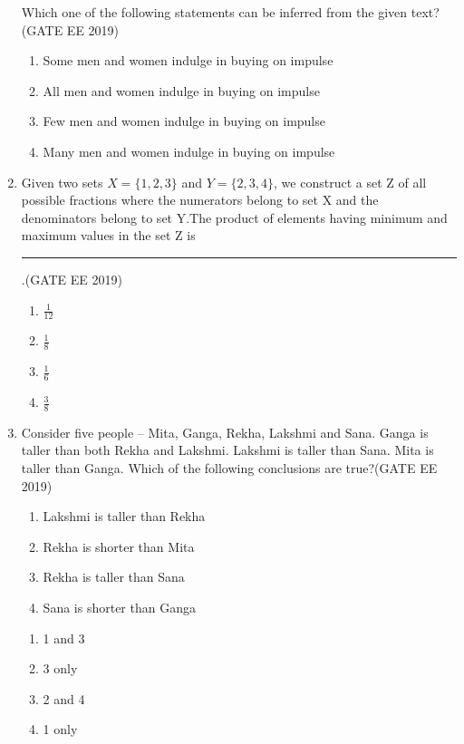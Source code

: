 \documentclass[a4paper,10pt]{exam}
\theoremstyle{remark}
\begin{document}
\begin{enumerate}
Which one of the following statements can be inferred from the given text?\hfill{(GATE EE 2019)}
\begin{enumerate}
    \item Some men and women indulge in buying on impulse
    \item All men and women indulge in buying on impulse
    \item Few men and women indulge in buying on impulse
    \item Many men and women indulge in buying on impulse
\end{enumerate}
\item  Given two sets $ X = \{ 1, 2, 3 \}$  and $ Y = \{ 2, 3, 4 \} $, we construct a set Z of all possible fractions where the numerators belong to set X and the denominators belong to set Y.The product of elements having minimum and maximum values in the set Z is \rule{1.5cm}{0.15mm} .\hfill{(GATE EE 2019)}
\begin{multicols}{4}
\begin{enumerate}
\item $\frac{1}{12}$
\item $\frac{1}{8}$
\item $\frac{1}{6}$
\item $\frac{3}{8}$
\end{enumerate}
\end{multicols}

\item Consider five people -- Mita, Ganga, Rekha, Lakshmi and Sana. Ganga is taller than both Rekha and Lakshmi. Lakshmi is taller than Sana. Mita is taller than Ganga. Which of the following conclusions are true?\hfill{(GATE EE 2019)}
\begin{enumerate}
    \item Lakshmi is taller than Rekha
    \item Rekha is shorter than Mita
    \item Rekha is taller than Sana
    \item Sana is shorter than Ganga
\end{enumerate}

\begin{enumerate}
\item 1 and 3
\item 3 only
\item 2 and 4
\item 1 only
\end{enumerate}

\vspace{1cm}


\end{enumerate}
\end{document}
